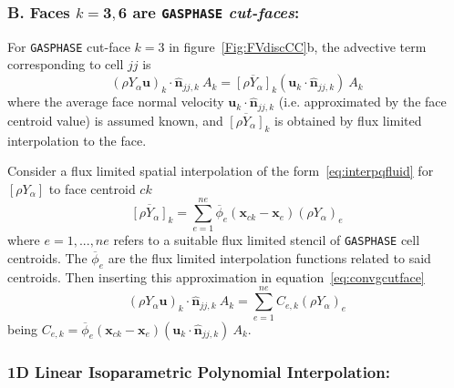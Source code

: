 \documentclass[12pt]{article}
\begin{document}
\subsubsection*{B. Faces $k=\mathbf{3},\mathbf{6}$ are \texttt{GASPHASE} \textit{cut-faces}:}

For \texttt{GASPHASE} cut-face $k=3$ in figure~\ref{Fig:FVdiscCC}b, the advective term corresponding to cell $jj$ is
%
\begin{equation}
  \left( \rho Y_\alpha \mathbf{u} \right)_k \cdot \hat{\mathbf{n}}_{jj,k} \: A_k = \overline{[\rho Y_\alpha]}_k \left( \mathbf{u}_k \cdot \hat{\mathbf{n}}_{jj,k} \right) \: A_k \label{eq:convgcutface}
\end{equation}
%
where the average face normal velocity $\mathbf{u}_k \cdot \hat{\mathbf{n}}_{jj,k} $ (i.e. approximated by the face centroid value) is assumed known, and $\overline{[\rho Y_\alpha]}_k$ is obtained by flux limited interpolation to the face.

Consider a flux limited spatial interpolation of the form~\eqref{eq:interpqfluid} for $[\rho Y_\alpha]$ to face centroid $ck$
%
\begin{equation}
  \overline{[\rho Y_\alpha]}_k = \sum^{ne}_{e=1} \overline{\phi}_e(\mathbf{x}_{ck}-\mathbf{x}_e) \left( \rho Y_{\alpha} \right)_e
\end{equation}
%
where $e=1,...,ne$ refers to a suitable flux limited stencil of \texttt{GASPHASE} cell centroids. The $\overline{\phi}_e$ are the flux limited interpolation functions  related to said centroids. Then inserting this approximation in equation~\eqref{eq:convgcutface}
%
\begin{equation}
  \left( \rho Y_\alpha \mathbf{u} \right)_k \cdot \hat{\mathbf{n}}_{jj,k} \: A_k = \sum^{ne}_{e=1}  C_{e,k} \left( \rho Y_{\alpha} \right)_e
\end{equation}
being $C_{e,k}=\overline{\phi}_e(\mathbf{x}_{ck}-\mathbf{x}_e) \left( \mathbf{u}_k \cdot \hat{\mathbf{n}}_{jj,k} \right) \: A_k$.


\subsubsection*{1D Linear Isoparametric Polynomial Interpolation:}
\end{document}
